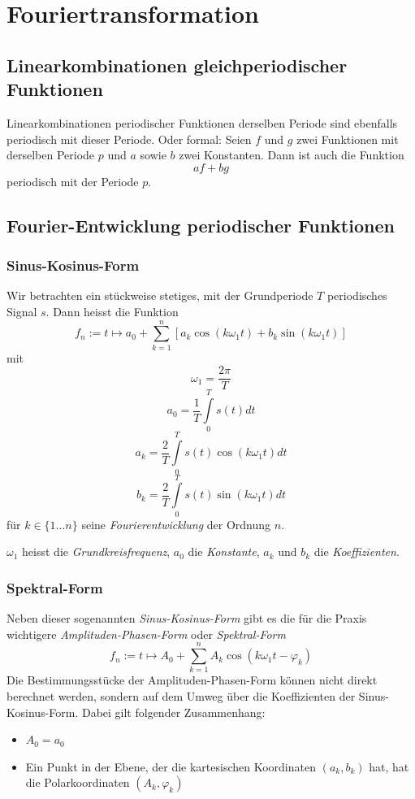 \documentclass[10pt,a4paper]{scrartcl}
\begin{document}
\section{Fouriertransformation}


\subsection{Linearkombinationen gleichperiodischer Funktionen}

Linearkombinationen periodischer Funktionen derselben Periode sind
ebenfalls periodisch mit dieser Periode. Oder formal: Seien $f$ und
$g$ zwei Funktionen mit derselben Periode $p$ und $a$ sowie $b$ zwei
Konstanten. Dann ist auch die Funktion
$$af+bg$$
periodisch mit der Periode $p$.


\subsection{Fourier-Entwicklung periodischer Funktionen}

\subsubsection{Sinus-Kosinus-Form}
Wir betrachten ein stückweise stetiges, mit der Grundperiode $T$
periodisches Signal $s$. Dann heisst die Funktion
$$f_n := t \mapsto a_0 + \sum_{k=1}^n \left[ a_k \cos(k\omega_1t) + b_k\sin(k\omega_1t)\right]$$
mit
$$\omega_1 = \frac{2\pi}{T}$$
$$a_0 = \frac{1}{T} \int\limits_0^T s(t) dt$$
$$a_k = \frac{2}{T} \int\limits_0^T s(t) \cos(k\omega_1t) dt$$
$$b_k = \frac{2}{T}\int\limits_0^T s(t) \sin(k\omega_1t) dt$$
für $k \in \{1...n\}$ seine \textit{Fourierentwicklung} der Ordnung $n$.

$\omega_1$ heisst die \textit{Grundkreisfrequenz}, $a_0$ die \textit{Konstante},
$a_k$ und $b_k$ die \textit{Koeffizienten}.

\subsubsection{Spektral-Form}
Neben dieser sogenannten \textit{Sinus-Kosinus-Form} gibt es die für die
Praxis wichtigere \textit{Amplituden-Phasen-Form} oder \textit{Spektral-Form}
$$f_n := t \mapsto A_0 + \sum_{k=1}^n A_k \cos(k\omega_1t - \varphi_k)$$
Die Bestimmungsstücke der Amplituden-Phasen-Form können nicht direkt
berechnet werden, sondern auf dem Umweg über die Koeffizienten
der Sinus-Kosinus-Form. Dabei gilt folgender Zusammenhang:
\begin{itemize}
\item $A_0 = a_0$
\item Ein Punkt in der Ebene, der die kartesischen Koordinaten $(a_k, b_k)$
hat, hat die Polarkoordinaten $(A_k, \varphi_k)$
\end{itemize}
\end{document}
